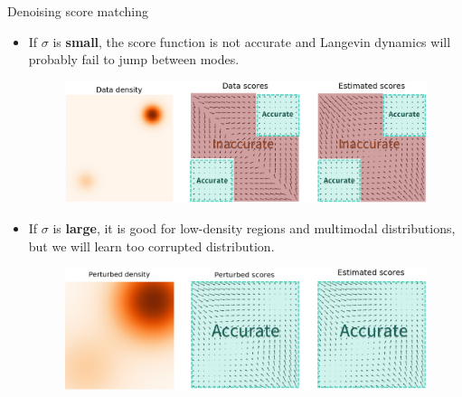 \begin{frame}{Denoising score matching}
	\begin{itemize}
		\item If $\sigma$ is \textbf{small}, the score function is not accurate and Langevin dynamics will probably fail to jump between modes.
		\begin{figure}
			\includegraphics[width=0.75\linewidth]{figs/pitfalls}
		\end{figure}
		\item If $\sigma$ is \textbf{large}, it is good for low-density regions and  multimodal distributions, but we will learn too corrupted distribution.
		\begin{figure}
			\includegraphics[width=0.75\linewidth]{figs/single_noise}
		\end{figure}
	\end{itemize}
\end{frame}
